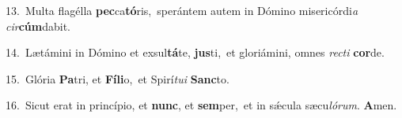 {\numbfont\textcolor{\numbcolor}{13.}}~Multa flagélla \textbf{pec}\-ca\-\textbf{tó}\-ris,~\star sperántem autem in Dómino misericórdi\textit{a} \textit{cir}\-\textbf{cúm}dabit.\par
{\numbfont\textcolor{\numbcolor}{14.}}~Lætámini in Dómino et exsul\-\textbf{tá}\-te, \textbf{jus}\-ti,~\star et gloriámini, omnes \textit{rec}\-\textit{ti} \textbf{cor}\-de.\par
{\numbfont\textcolor{\numbcolor}{15.}}~Glória \textbf{Pa}\-tri, et \textbf{Fí}\-\textbf{li}o,~\star et Spirí\-\textit{tu}\-\textit{i} \textbf{Sanc}\-to.\par
{\numbfont\textcolor{\numbcolor}{16.}}~Sicut erat in princípio, et \textbf{nunc}\-, et \textbf{sem}\-per,~\star et in sǽcula sæcu\-\textit{ló}\-\textit{rum}. \textbf{A}\-men.\par
